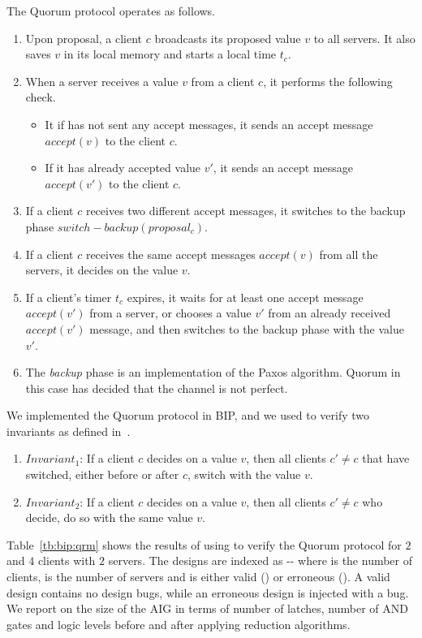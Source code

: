 The Quorum protocol operates as follows.
\begin{enumerate}
 \item Upon proposal, a client $c$ broadcasts its proposed value 
 $v$ to all servers. It also saves $v$ in its local memory and starts a local time
 $t_c$. 
 \item When a server receives a value $v$ from a client $c$, it performs
 the following check.
 \begin{itemize}
  \item It if has not sent any accept messages, it sends an accept message
  $accept(v)$ to the client $c$. 
  \item If it has already accepted value $v'$, it sends an accept message
  $accept(v')$ to the client $c$. 
 \end{itemize}
 \item If a client $c$ receives two different accept messages, it switches
 to the backup phase $switch-backup(proposal_c)$.
 \item If a client $c$ receives the same accept messages $accept(v)$ from all the servers,
 it decides on the value $v$.
 \item If a client's timer $t_c$ expires, it waits for at least
 one accept message $accept(v')$ from a server, or chooses a value $v'$
 from an already received $accept(v')$ message, and then switches to 
 the backup phase with the value $v'$. 
 \item The {\em backup} phase is an implementation of the Paxos algorithm. Quorum in this
 case has decided that the channel is not perfect. 
\end{enumerate}

We implemented the Quorum protocol in BIP, and we used \biptool{} to verify 
two invariants as defined in~\cite{guerraoui2012speculative}.
\begin{enumerate}
 \item $Invariant_1$: If a client $c$ decides on a value $v$, then all clients 
 $c' \neq c$ that have switched, either before or after $c$, switch with the value $v$.
 \item $Invariant_2$: If a client $c$ decides on a value $v$, then all clients
 $c' \neq c$ who decide, do so with the same value $v$. 
\end{enumerate}

Table~\ref{tb:bip:qrm} shows the results of using \biptool{} to verify the 
Quorum protocol for $2$ and $4$ clients with $2$ servers. The designs
are indexed as -- where 
 is the number of clients,  is the number of 
servers and  is either valid () or erroneous ().
A valid design contains no design bugs, while an erroneous design is injected
with a bug. We report on the size of the AIG in terms of number of latches,
number of AND gates and logic levels before and after
applying reduction algorithms.

